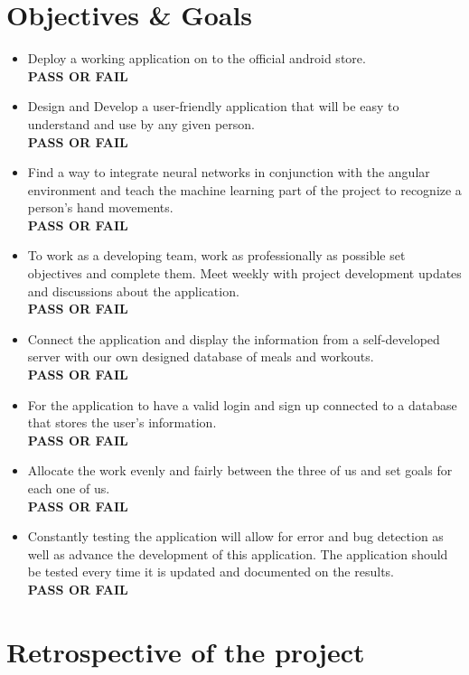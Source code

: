 \documentclass[a4paper,12pt]{report}
\begin{document}
\section{Objectives \& Goals}

\begin{itemize}
\item Deploy a working application on to the official android store.\\
\textbf{PASS OR FAIL}
\item Design and Develop a user-friendly application that will be easy to understand and use by any given person.\\
\textbf{PASS OR FAIL}
\item  Find a way to integrate neural networks in conjunction with the angular environment and teach the machine learning part of the project to recognize a person's hand movements.\\
\textbf{PASS OR FAIL}
\item To work as a developing team, work as professionally as possible set objectives and complete them. Meet weekly with project development updates and discussions about the application.\\
\textbf{PASS OR FAIL}
\item Connect the application and display the information from a self-developed server with our own designed database of meals and workouts.\\
\textbf{PASS OR FAIL}
\item For the application to have a valid login and sign up connected to a database that stores the user's information.\\
\textbf{PASS OR FAIL}
\item Allocate the work evenly and fairly between the three of us and set goals for each one of us.\\
\textbf{PASS OR FAIL}
\item Constantly testing the application will allow for error and bug detection as well as advance the development of this application. The application should be tested every time it is updated and documented on the results.\\
\textbf{PASS OR FAIL}
\end{itemize}


\newpage
\section{Retrospective of the project}
\end{document}
